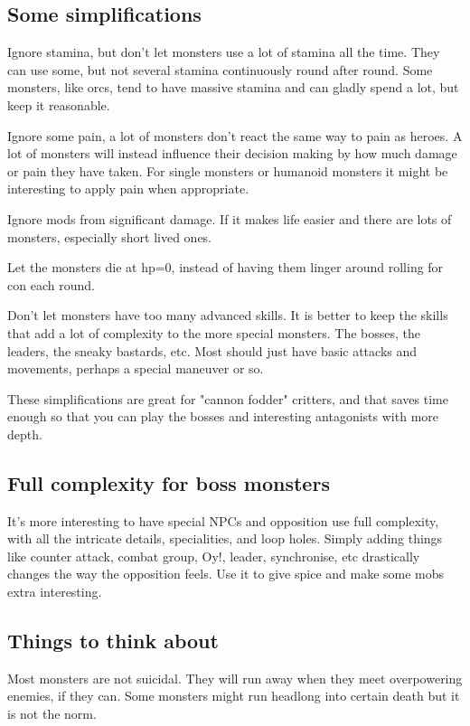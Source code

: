\subsection*{Some simplifications}
Ignore stamina, but don't let monsters use a lot of stamina all the time. They can use some, but not several stamina continuously round after round. Some monsters, like orcs, tend to have massive stamina and can gladly spend a lot, but keep it reasonable.

Ignore some pain, a lot of monsters don't react the same way to pain as heroes. A lot of monsters will instead influence their decision making by how much damage or pain they have taken. For single monsters or humanoid monsters it might be interesting to apply pain when appropriate.

Ignore mods from significant damage. If it makes life easier and there are lots of monsters, especially short lived ones.

Let the monsters die at hp=0, instead of having them linger around rolling for con each round.

Don't let monsters have too many advanced skills. It is better to keep the skills that add a lot of complexity to the more special monsters. The bosses, the leaders, the sneaky bastards, etc. Most should just have basic attacks and movements, perhaps a special maneuver or so.

These simplifications are great for "cannon fodder" critters, and that saves time enough so that you can play the bosses and interesting antagonists with more depth.


\subsection*{Full complexity for boss monsters}
It's more interesting to have special NPCs and opposition use full complexity, with all the intricate details, specialities, and loop holes. Simply adding things like counter attack, combat group, Oy!, leader, synchronise, etc drastically changes the way the opposition feels. Use it to give spice and make some mobs extra interesting.


\subsection*{Things to think about}
Most monsters are not suicidal. They will run away when they meet overpowering enemies, if they can. Some monsters might run headlong into certain death but it is not the norm.

